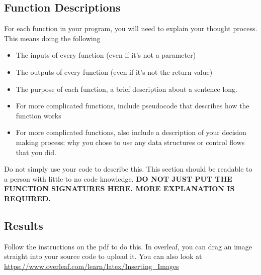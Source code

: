\documentclass{article}
\begin{document}
\subsection*{Function Descriptions}
For each function in your program, you will need to explain your thought process. This means doing the following
\begin{itemize}
    \item The inputs of every function (even if it's not a parameter)
    \item The outputs of every function (even if it's not the return value)
    \item The purpose of each function, a brief description about a sentence long. 
    \item For more complicated functions, include pseudocode that describes how the function works
    \item For more complicated functions, also include a description of your decision making process; why you chose to use any data structures or control flows that you did.
\end{itemize}
Do not simply use your code to describe this. This section should be readable to a person with little to no code knowledge. 
\textbf{DO NOT JUST PUT THE FUNCTION SIGNATURES HERE. MORE EXPLANATION IS REQUIRED.}

\subsection*{Results}
Follow the instructions on the pdf to do this. 
In overleaf, you can drag an image straight into your source code to upload it. You can also look at \url{https://www.overleaf.com/learn/latex/Inserting_Images}


\end{document}
